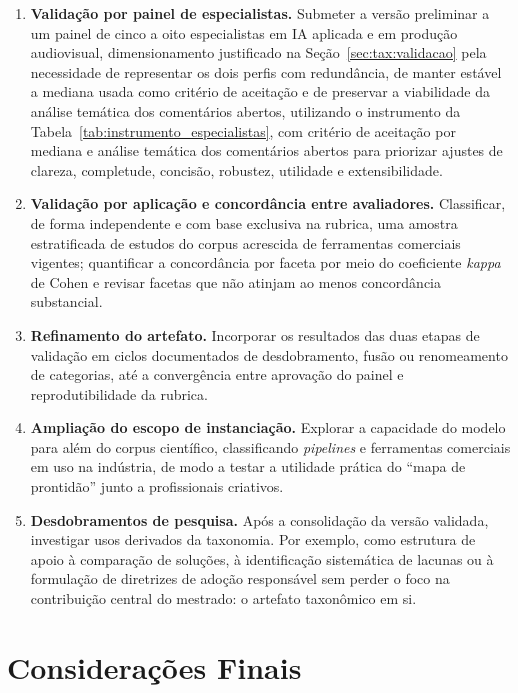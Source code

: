 \begin{enumerate}
    \item \textbf{Validação por painel de especialistas.} Submeter a versão preliminar a um painel de cinco a oito especialistas em IA aplicada e em produção audiovisual, dimensionamento justificado na Seção~\ref{sec:tax:validacao} pela necessidade de representar os dois perfis com redundância, de manter estável a mediana usada como critério de aceitação e de preservar a viabilidade da análise temática dos comentários abertos, utilizando o instrumento da Tabela~\ref{tab:instrumento_especialistas}, com critério de aceitação por mediana e análise temática dos comentários abertos para priorizar ajustes de clareza, completude, concisão, robustez, utilidade e extensibilidade.

    \item \textbf{Validação por aplicação e concordância entre avaliadores.} Classificar, de forma independente e com base exclusiva na rubrica, uma amostra estratificada de estudos do corpus acrescida de ferramentas comerciais vigentes; quantificar a concordância por faceta por meio do coeficiente \textit{kappa} de Cohen e revisar facetas que não atinjam ao menos concordância substancial.

    \item \textbf{Refinamento do artefato.} Incorporar os resultados das duas etapas de validação em ciclos documentados de desdobramento, fusão ou renomeamento de categorias, até a convergência entre aprovação do painel e reprodutibilidade da rubrica.

    \item \textbf{Ampliação do escopo de instanciação.} Explorar a capacidade do modelo para além do corpus científico, classificando \textit{pipelines} e ferramentas comerciais em uso na indústria, de modo a testar a utilidade prática do ``mapa de prontidão'' junto a profissionais criativos.

    \item \textbf{Desdobramentos de pesquisa.} Após a consolidação da versão validada, investigar usos derivados da taxonomia. Por exemplo, como estrutura de apoio à comparação de soluções, à identificação sistemática de lacunas ou à formulação de diretrizes de adoção responsável sem perder o foco na contribuição central do mestrado: o artefato taxonômico em si.
\end{enumerate}

\section{Considerações Finais}


